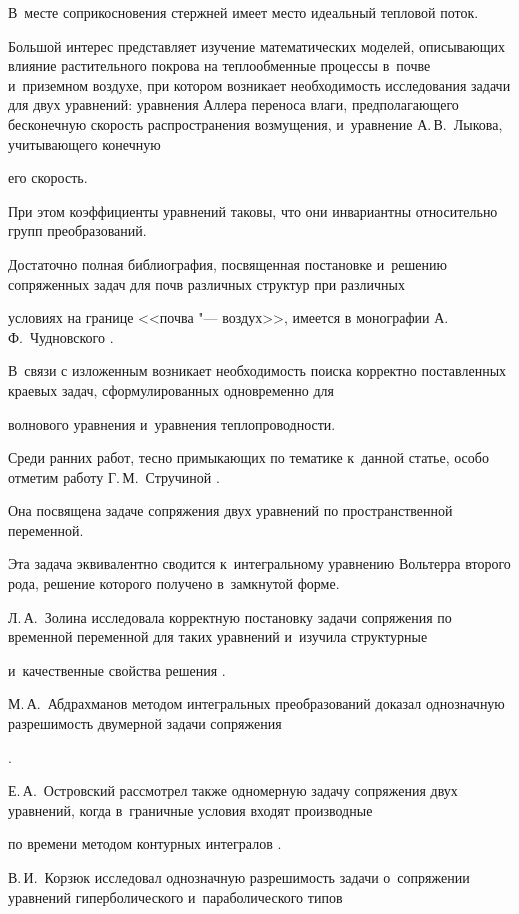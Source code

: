 В~месте соприкосновения стержней имеет место идеальный тепловой поток.

Большой интерес представляет изучение математических моделей, описывающих влияние растительного покрова на теплообменные процессы в~почве и~приземном воздухе, при котором возникает необходимость исследования задачи для двух уравнений: уравнения Аллера переноса влаги, предполагающего бесконечную скорость распространения возмущения, и~уравнение А.\,В.~Лыкова, учитывающего конечную

его скорость.

При этом коэффициенты уравнений таковы, что они инвариантны относительно групп преобразований.



Достаточно полная библиография, посвященная постановке и~решению сопряженных задач для почв различных структур при различных

условиях на границе <<почва "--- воздух>>, имеется в монографии  А.\,Ф.~Чудновского \cite{eleevbalk:bib:Chudn}.

В~связи с изложенным возникает необходимость поиска корректно поставленных краевых задач, сформулированных одновременно для

волнового уравнения и~уравнения теплопроводности.

Среди ранних работ, тесно примыкающих по тематике к~данной статье, особо отметим работу Г.\,М.~Стручиной \cite{eleevbalk:bib:Str}.

Она посвящена задаче сопряжения двух уравнений по пространственной переменной.

Эта задача эквивалентно сводится к~интегральному уравнению Вольтерра второго рода, решение которого получено в~замкнутой форме.

Л.\,А.~Золина исследовала корректную постановку задачи сопряжения по временной переменной для таких уравнений и~изучила структурные

и~качественные свойства решения \cite{eleevbalk:bib:Zol}.

М.\,А.~Абдрахманов методом интегральных преобразований доказал однозначную разрешимость двумерной задачи сопряжения

\cite{eleevbalk:bib:Abdr}.

Е.\,А.~Островский рассмотрел также одномерную задачу сопряжения двух уравнений, когда в~граничные условия входят производные

по времени методом контурных интегралов \cite{eleevbalk:bib:Ostr}.

В.\,И.~Корзюк исследовал однозначную разрешимость задачи о~сопряжении уравнений гиперболического и~параболического типов

